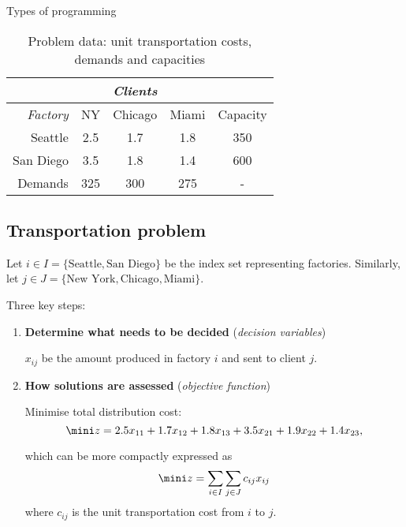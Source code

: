 \begin{frame}{Types of programming}
\begin{center}
\begin{table}
\begin{tabular}{r|ccc|c}
    & & {\it Clients} &\\\hline
    {\it Factory} & NY & Chicago & Miami & Capacity \\\hline
    Seattle & 2.5      & 1.7    & 1.8   & 350 \\
    San Diego & 3.5 & 1.8 & 1.4 & 600 \\\hline
    Demands & 325 & 300 & 275 & - \\\hline
\end{tabular}
\caption{Problem data: unit transportation costs, demands and capacities}
\end{table}
\end{center}



\subsection{Transportation problem}


Let $i \in I = \{\text{Seattle}, \text{San Diego}\}$ be the index set representing factories. Similarly, let $j \in J = \{\text{New York}, \text{Chicago}, \text{Miami}\}$.


Three key steps:

\begin{enumerate}
\item {\bf Determine what needs to be decided} ({\it decision variables})


$x_{ij}$ be the amount produced in factory $i$ and sent to client $j$.


\item {\bf How solutions are assessed} ({\it objective function})

Minimise total distribution cost:
%
$$ \mini z = 2.5x_{11} + 1.7x_{12} + 1.8x_{13} + 3.5x_{21} + 1.9x_{22} + 1.4x_{23},
$$
%

which can be more compactly expressed as 
%
$$\mini z = \sum_{i \in I}\sum_{j \in J}c_{ij}x_{ij}$$
where $c_{ij}$ is the unit transportation cost from $i$ to $j$.
%
\end{enumerate}



\end{frame}
